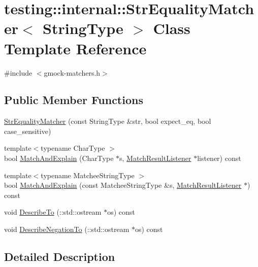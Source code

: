 \hypertarget{classtesting_1_1internal_1_1_str_equality_matcher}{}\section{testing\+:\+:internal\+:\+:Str\+Equality\+Matcher$<$ String\+Type $>$ Class Template Reference}
\label{classtesting_1_1internal_1_1_str_equality_matcher}


{\ttfamily \#include $<$gmock-\/matchers.\+h$>$}

\subsection*{Public Member Functions}
\begin{DoxyCompactItemize}
\item 
\hyperlink{classtesting_1_1internal_1_1_str_equality_matcher_a613006d82018b18ef8fded721f70f860}{Str\+Equality\+Matcher} (const String\+Type \&str, bool expect\+\_\+eq, bool case\+\_\+sensitive)
\item 
{\footnotesize template$<$typename Char\+Type $>$ }\\bool \hyperlink{classtesting_1_1internal_1_1_str_equality_matcher_a5c696e2d4a9d554b310f35aa98ca0abe}{Match\+And\+Explain} (Char\+Type $\ast$s, \hyperlink{classtesting_1_1_match_result_listener}{Match\+Result\+Listener} $\ast$listener) const 
\item 
{\footnotesize template$<$typename Matchee\+String\+Type $>$ }\\bool \hyperlink{classtesting_1_1internal_1_1_str_equality_matcher_a7505a569f02ea659e9fb25f79adab002}{Match\+And\+Explain} (const Matchee\+String\+Type \&s, \hyperlink{classtesting_1_1_match_result_listener}{Match\+Result\+Listener} $\ast$) const 
\item 
void \hyperlink{classtesting_1_1internal_1_1_str_equality_matcher_a6e4b5d5158b93de3b76ef96ce31bd517}{Describe\+To} (\+::std\+::ostream $\ast$os) const 
\item 
void \hyperlink{classtesting_1_1internal_1_1_str_equality_matcher_af3babfa0467bfda0040855c4e1bb6ac6}{Describe\+Negation\+To} (\+::std\+::ostream $\ast$os) const 
\end{DoxyCompactItemize}


\subsection{Detailed Description}
